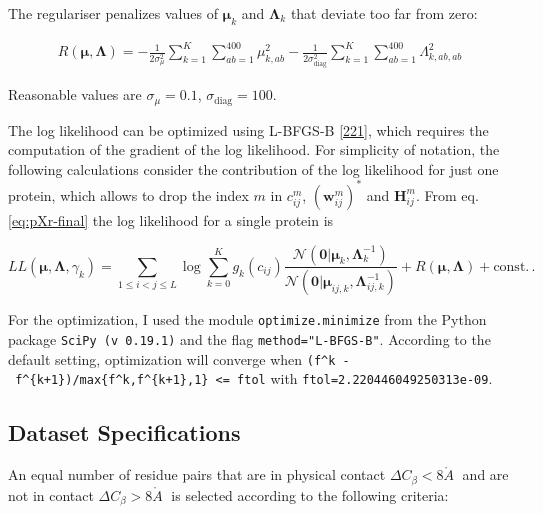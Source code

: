 \documentclass[11pt,a4paper,twoside]{book}
\newcommand{\Cb}{C_\beta}
\newcommand{\Gauss}{\mathcal{N}}
\renewcommand{\H}{\mathbf{H}}
\newcommand{\Hij}{\H_{ij}}
\newcommand{\Lijk}{\mathbf{\Lambda}_{ij,k}}
\newcommand{\Lk}{\mathbf{\Lambda}_k}
\newcommand{\muijk}{\mathbf{\mu}_{ij,k}}
\newcommand{\muk}{\mathbf{\mu}_k}
\newcommand{\cij}{c_{ij}}
\newcommand{\wij}{\mathbf{w}_{ij}}
\newcommand{\angstrom}{\mathring{A} \;}
\theoremstyle{definition}
\theoremstyle{definition}
\theoremstyle{remark}
\begin{document}
The regulariser penalizes values of \(\muk\) and \(\Lk\) that deviate
too far from zero:

\begin{align}
    R(\mathbf{\mu}, \mathbf{\Lambda}) = -\frac{1}{2 \sigma_{\mu}^2} \sum_{k=1}^K \sum_{ab=1}^{400} \mu_{k,ab}^2 
                        -\frac{1}{2 \sigma_\text{diag}^2} \sum_{k=1}^K \sum_{ab=1}^{400} \Lambda_{k,ab,ab}^2
\label{eq:reg}
\end{align}

Reasonable values are \(\sigma_{\mu}=0.1\),
\(\sigma_\text{diag} = 100\).

The log likelihood can be optimized using L-BFGS-B
{[}\protect\hyperlink{ref-Byrd1995}{221}{]}, which requires the
computation of the gradient of the log likelihood. For simplicity of
notation, the following calculations consider the contribution of the
log likelihood for just one protein, which allows to drop the index
\(m\) in \(\cij^m\), \((\wij^m)^*\) and \(\Hij^m\). From eq.
\eqref{eq:pXr-final} the log likelihood for a single protein is

\begin{equation}
    L\!L(\mathbf{\mu}, \mathbf{\Lambda}, \gamma_k) =  \sum_{1 \le i < j \le L}  \log \sum_{k=0}^K g_{k}(\cij) \frac{\Gauss( \mathbf{0} | \muk, \Lk^{-1})}{\Gauss(\mathbf{0} | \muijk, \Lijk^{-1})}  + R(\mathbf{\mu}, \mathbf{\Lambda}) + \text{const.}\,.
\label{eq:ll-coupling-prior}
\end{equation}

For the optimization, I used the module \texttt{optimize.minimize} from
the Python package \texttt{SciPy\ (v\ 0.19.1)} and the flag
\texttt{method="L-BFGS-B"}. According to the default setting,
optimization will converge when
\texttt{(f\^{}k\ -\ f\^{}\{k+1\})/max\{\textbar{}f\^{}k\textbar{},\textbar{}f\^{}\{k+1\}\textbar{},1\}\ \textless{}=\ ftol}
with \texttt{ftol=2.220446049250313e-09}.

\subsection{Dataset
Specifications}\label{dataset-training-hyperparmeters}

An equal number of residue pairs that are in physical contact
\(\Delta\Cb <8 \angstrom\) and are not in contact
\(\Delta\Cb >8 \angstrom\) is selected according to the following
criteria:
\end{document}

